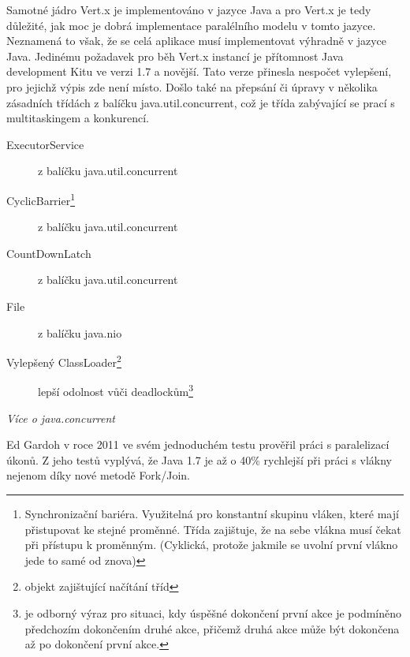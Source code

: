 Samotné jádro Vert.x je implementováno v jazyce Java a pro Vert.x je tedy důležité, jak moc je dobrá implementace paralélního modelu v tomto jazyce. Neznamená to však, že se celá aplikace musí implementovat výhradně v jazyce Java. Jedinému požadavek pro běh Vert.x instancí je přítomnost Java development Kitu ve verzi 1.7 a novější. Tato verze přinesla nespočet vylepšení, pro jejichž výpis zde není místo. Došlo také na přepsání či úpravy v několika zásadních třídách z balíčku java.util.concurrent, což je třída zabývající se prací s multitaskingem a konkurencí.
\begin{description}
\item[ExecutorService]{z balíčku java.util.concurrent}
\item[CyclicBarrier\footnote{Synchronizační bariéra. Využitelná pro konstantní skupinu vláken, které mají přistupovat ke stejné proměnné. Třída zajištuje, že na sebe vlákna musí čekat při přístupu k proměnným. (Cyklická, protože jakmile se uvolní první vlákno jede to samé od znova)}]{z balíčku java.util.concurrent}
\item[CountDownLatch]{z balíčku java.util.concurrent}
\item[File]{z balíčku java.nio}
\item[Vylepšený ClassLoader\footnote{objekt zajištující načítání tříd}]{lepší odolnost vůči deadlockům\footnote{ je odborný výraz pro situaci, kdy úspěšné dokončení první akce je podmíněno předchozím dokončením druhé akce, přičemž druhá akce může být dokončena až po dokončení první akce.}}
\end{description}
\emph{Více o java.concurrent\cite{javaChangelog}}

Ed Gardoh v roce 2011 ve svém jednoduchém testu\cite{serialTest} prověřil práci s paralelizací úkonů. Z jeho testů vyplývá, že Java 1.7 je až o 40\% rychlejší při práci s vlákny nejenom díky nové metodě Fork/Join\cite{forkJoin}.

